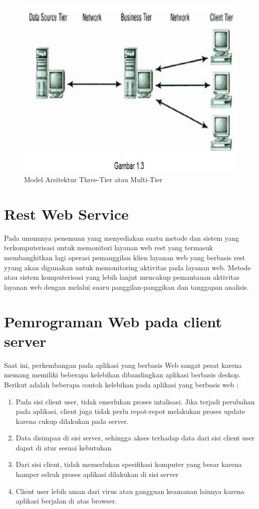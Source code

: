 \begin{figure}[ht]
    \centerline{\includegraphics[width=1\textwidth]{figures/2model3tier.jpg}}
    \caption{Model Arsitektur Three-Tier atau Multi-Tier}
    \label{Tier3}
\end{figure}

\section{Rest Web Service}
Pada umumnya penemuan yang menyediakan suatu metode dan sistem yang terkomputerisasi untuk memonitori layanan web rest yang termasuk
membangkitkan lagi operasi pemanggilan klien layanan web yang berbasis rest yyang akan digunakan untuk memonitoring aktivitas pada layanan web.
Metode atau sistem komputerisasi yang lebih lanjut mencakup pemantauan aktivitas layanan web dengan melalui suaru panggilan-panggikan dan tanggapan analisis.

\section{Pemrograman Web pada client server}
Saat ini, perkembangan pada aplikasi yang berbasis Web sangat pesat karena memang memiliki beberapa kelebihan dibandingkan aplikasi berbasis deskop. Berikut adalah beberapa contoh kelebihan pada aplikasi yang berbasis web :

\begin{enumerate}
    \item Pada sisi client user, tidak emerlukan proses intalisasi. Jika terjadi perubahan pada aplikasi, client juga tidak perlu repot-repot melakukan proses update karena cukup dilakukan  pada server.
    \item Data disimpan di sisi server, sehingga akses terhadap data dari sisi client user dapat di atur sesuai kebutuhan
    \item Dari sisi client, tidak memerlukan spesifikasi komputer yang besar karena hamper selruh proses aplikasi dilakukan di sisi server
    \item Client user lebih aman dari virus atau gangguan keamanan lainnya karena aplikasi berjalan di atas browser.
\end{enumerate}

